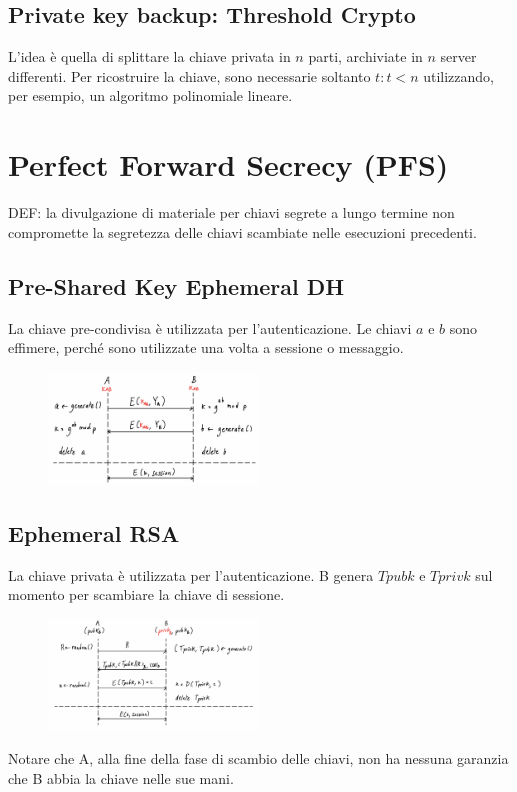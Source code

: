 \documentclass[a4paper,12pt]{article}
\begin{document}
\subsection{Private key backup: Threshold Crypto}
L'idea è quella di splittare la chiave privata in $n$ parti, archiviate in $n$ server differenti.
Per ricostruire la chiave, sono necessarie soltanto $t : t < n$ utilizzando, per esempio, un algoritmo polinomiale lineare.

\section{Perfect Forward Secrecy (PFS)}
DEF: la divulgazione di materiale per chiavi segrete a lungo termine non compromette la segretezza delle chiavi scambiate nelle esecuzioni precedenti.

\subsection{Pre-Shared Key Ephemeral DH}
La chiave pre-condivisa è utilizzata per l'autenticazione.
Le chiavi $a$ e $b$ sono effimere, perché sono utilizzate una volta a sessione o messaggio.
\begin{figure}[H]
  \centering
  \includegraphics[width=0.5\textwidth]{img/psk-dhe}
\end{figure}

\subsection{Ephemeral RSA}
La chiave privata è utilizzata per l'autenticazione.
B genera $Tpubk$ e $Tprivk$ sul momento per scambiare la chiave di sessione.
\begin{figure}[H]
  \centering
  \includegraphics[width=0.5\textwidth]{img/rsae}
\end{figure}
Notare che A, alla fine della fase di scambio delle chiavi, non ha nessuna garanzia che B abbia la chiave nelle sue mani.
\end{document}
